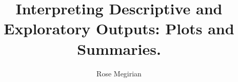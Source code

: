 \documentclass[
  letterpaper,
  DIV=11,
  numbers=noendperiod]{scrartcl}
\title{Interpreting Descriptive and Exploratory Outputs: Plots and
Summaries.}
\author{Rose Megirian}
\date{}
\renewcommand*\contentsname{Table of contents}
\newcommand\contentsname{Table of contents}
\begin{document}
\maketitle

\renewcommand*\contentsname{Table of contents}
{
\hypersetup{linkcolor=}
\setcounter{tocdepth}{3}
\tableofcontents
}
\end{document}
